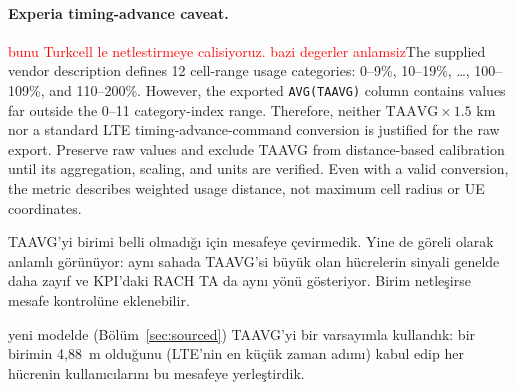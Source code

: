 \documentclass[11pt,a4paper]{article}
\newcommand{\red}[1]{\textcolor{red}{#1}}
\newenvironment{progress}{\par\smallskip\color{blue}}{\par\smallskip}
\newenvironment{yeni}{\par\smallskip\color{teal}}{\par\smallskip}
\begin{document}
\paragraph{Experia timing-advance caveat.} \red{bunu Turkcell le netlestirmeye calisiyoruz. bazi degerler anlamsiz}The supplied vendor description defines 12 cell-range usage categories: 0--9\%, 10--19\%, \ldots, 100--109\%, and 110--200\%. However, the exported \texttt{AVG(TAAVG)} column contains values far outside the 0--11 category-index range. Therefore, neither $\mathrm{TAAVG}\times 1.5$ km nor a standard LTE timing-advance-command conversion is justified for the raw export. Preserve raw values and exclude TAAVG from distance-based calibration until its aggregation, scaling, and units are verified. Even with a valid conversion, the metric describes weighted usage distance, not maximum cell radius or UE coordinates.

\begin{progress}
TAAVG'yi birimi belli olmadığı için mesafeye çevirmedik. Yine de göreli olarak anlamlı görünüyor: aynı sahada TAAVG'si büyük olan hücrelerin sinyali genelde daha zayıf ve KPI'daki RACH TA da aynı yönü gösteriyor. Birim netleşirse mesafe kontrolüne eklenebilir.
\end{progress}

\begin{yeni}
yeni modelde (Bölüm~\ref{sec:sourced}) TAAVG'yi bir varsayımla kullandık: bir birimin 4,88~m olduğunu (LTE'nin en küçük zaman adımı) kabul edip her hücrenin kullanıcılarını bu mesafeye yerleştirdik.
\end{yeni}
\end{document}
